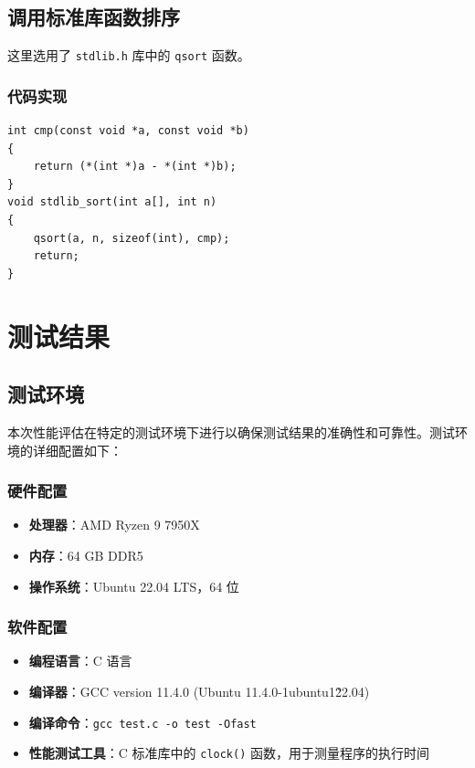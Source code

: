 \documentclass[12pt]{article}
\begin{document}
\subsection{调用标准库函数排序}

这里选用了 \verb|stdlib.h| 库中的 \verb|qsort| 函数。

\subsubsection{代码实现}

{\setmainfont{Consolas} %
\begin{lstlisting}
int cmp(const void *a, const void *b)
{
    return (*(int *)a - *(int *)b);
}
void stdlib_sort(int a[], int n)
{
    qsort(a, n, sizeof(int), cmp);
    return;
}
\end{lstlisting}
}

\newpage

\section{测试结果}

\subsection{测试环境}

本次性能评估在特定的测试环境下进行以确保测试结果的准确性和可靠性。测试环境的详细配置如下：

\subsubsection*{硬件配置}
\begin{itemize}
    \item \textbf{处理器}：AMD Ryzen 9 7950X
    \item \textbf{内存}：64 GB DDR5
    \item \textbf{操作系统}：Ubuntu 22.04 LTS，64 位
\end{itemize}

\subsubsection*{软件配置}
\begin{itemize}
    \item \textbf{编程语言}：C 语言
    \item \textbf{编译器}：GCC version 11.4.0 (Ubuntu 11.4.0-1ubuntu1\~22.04)
    \item \textbf{编译命令}：\verb|gcc test.c -o test -Ofast|
    \item \textbf{性能测试工具}：C 标准库中的 \verb|clock()| 函数，用于测量程序的执行时间
  \end{itemize}
\end{document}
